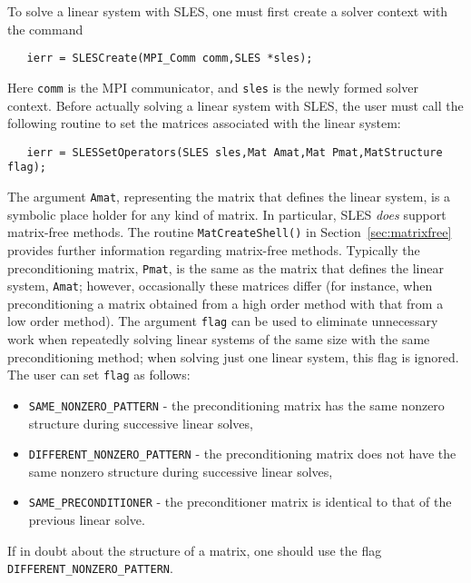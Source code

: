To solve a linear system with SLES, one must first create a solver context 
with the command 
\begin{verbatim}
   ierr = SLESCreate(MPI_Comm comm,SLES *sles); 
\end{verbatim}
Here {\tt comm} is the MPI communicator, and {\tt sles} is the newly
formed solver context.
Before actually solving a linear system with SLES, the user must call 
the following routine to set the matrices associated with the linear
system: 
\begin{verbatim}
   ierr = SLESSetOperators(SLES sles,Mat Amat,Mat Pmat,MatStructure flag);
\end{verbatim}
The argument {\tt Amat}, representing the matrix that defines the
linear system, is a symbolic place holder for any kind of matrix.  
In particular, SLES {\em does} support matrix-free methods. 
The routine {\tt MatCreateShell()} 
in Section~\ref{sec:matrixfree} provides further information regarding
matrix-free methods. 
Typically the preconditioning matrix, {\tt Pmat}, is the same as
the matrix that defines the linear system, {\tt Amat}; however,
occasionally these matrices differ (for instance, 
when preconditioning a matrix obtained from a high order method with 
that from a low order method).
The argument {\tt flag} can be used to eliminate unnecessary work when
repeatedly solving linear systems of the same size with the same 
preconditioning method; when solving just one linear system, this flag is
ignored.  The user can set {\tt flag} as follows:
\begin{itemize}
\item {\tt SAME\_NONZERO\_PATTERN} - the preconditioning matrix has the
    same  nonzero structure during successive
    linear solves,
\item {\tt DIFFERENT\_NONZERO\_PATTERN} - the preconditioning matrix does
     not have the same nonzero structure during successive linear solves,
\item {\tt SAME\_PRECONDITIONER} - the preconditioner matrix is identical
   to that of the previous linear solve. 
\end{itemize}
If in doubt about the structure of a matrix, one should use
the flag {\tt DIFFERENT\_NONZERO\_PATTERN}.
 

